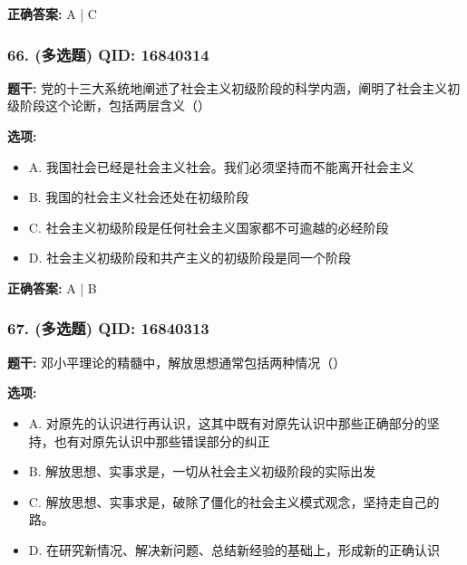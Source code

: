 \documentclass[12pt,UTF8]{ctexart}
\begin{document}
\textbf{正确答案:}
A | C

\vspace{0.3em}\hrulefill\vspace{0.7em}

\subsubsection*{66. (多选题) \small QID: 16840314}

\textbf{题干:}
党的十三大系统地阐述了社会主义初级阶段的科学内涵，阐明了社会主义初级阶段这个论断，包括两层含义（）

\textbf{选项:}
\begin{itemize}[leftmargin=*]

  \item A. 我国社会已经是社会主义社会。我们必须坚持而不能离开社会主义

  \item B. 我国的社会主义社会还处在初级阶段

  \item C. 社会主义初级阶段是任何社会主义国家都不可逾越的必经阶段

  \item D. 社会主义初级阶段和共产主义的初级阶段是同一个阶段

\end{itemize}

\textbf{正确答案:}
A | B

\vspace{0.3em}\hrulefill\vspace{0.7em}

\subsubsection*{67. (多选题) \small QID: 16840313}

\textbf{题干:}
邓小平理论的精髓中，解放思想通常包括两种情况（）

\textbf{选项:}
\begin{itemize}[leftmargin=*]

  \item A. 对原先的认识进行再认识，这其中既有对原先认识中那些正确部分的坚持，也有对原先认识中那些错误部分的纠正

  \item B. 解放思想、实事求是，一切从社会主义初级阶段的实际出发

  \item C. 解放思想、实事求是，破除了僵化的社会主义模式观念，坚持走自己的路。

  \item D. 在研究新情况、解决新问题、总结新经验的基础上，形成新的正确认识

\end{itemize}
\end{document}

